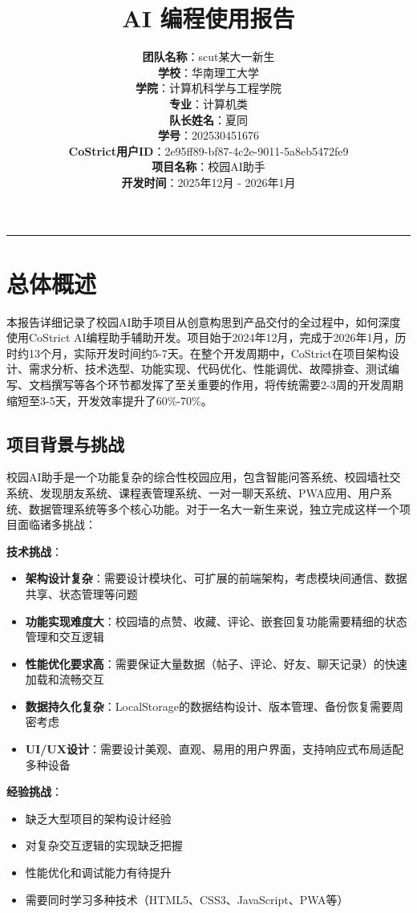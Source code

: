 ﻿\documentclass[12pt,a4paper]{article}
\title{\textbf{AI 编程使用报告}}
\author{
    \textbf{团队名称}：scut某大一新生 \\
    \vspace{0.3cm}
    \textbf{学校}：华南理工大学 \\
    \vspace{0.3cm}
    \textbf{学院}：计算机科学与工程学院 \\
    \vspace{0.3cm}
    \textbf{专业}：计算机类 \\
    \vspace{0.3cm}
    \textbf{队长姓名}：夏同 \\
    \vspace{0.3cm}
    \textbf{学号}：202530451676 \\
    \vspace{0.3cm}
    \textbf{CoStrict用户ID}：2e95ff89-bf87-4c2e-9011-5a8eb5472fe9 \\
    \vspace{0.3cm}
    \textbf{项目名称}：校园AI助手 \\
    \vspace{0.3cm}
    \textbf{开发时间}：2025年12月 - 2026年1月
}
\date{}
\begin{document}
\maketitle

\hrule
\vspace{1cm}

\section{总体概述}

本报告详细记录了校园AI助手项目从创意构思到产品交付的全过程中，如何深度使用CoStrict AI编程助手辅助开发。项目始于2024年12月，完成于2026年1月，历时约13个月，实际开发时间约5-7天。在整个开发周期中，CoStrict在项目架构设计、需求分析、技术选型、功能实现、代码优化、性能调优、故障排查、测试编写、文档撰写等各个环节都发挥了至关重要的作用，将传统需要2-3周的开发周期缩短至3-5天，开发效率提升了60\%-70\%。

\subsection{项目背景与挑战}

校园AI助手是一个功能复杂的综合性校园应用，包含智能问答系统、校园墙社交系统、发现朋友系统、课程表管理系统、一对一聊天系统、PWA应用、用户系统、数据管理系统等多个核心功能。对于一名大一新生来说，独立完成这样一个项目面临诸多挑战：

\textbf{技术挑战}：
\begin{itemize}
    \item \textbf{架构设计复杂}：需要设计模块化、可扩展的前端架构，考虑模块间通信、数据共享、状态管理等问题
    \item \textbf{功能实现难度大}：校园墙的点赞、收藏、评论、嵌套回复功能需要精细的状态管理和交互逻辑
    \item \textbf{性能优化要求高}：需要保证大量数据（帖子、评论、好友、聊天记录）的快速加载和流畅交互
    \item \textbf{数据持久化复杂}：LocalStorage的数据结构设计、版本管理、备份恢复需要周密考虑
    \item \textbf{UI/UX设计}：需要设计美观、直观、易用的用户界面，支持响应式布局适配多种设备
\end{itemize}

\textbf{经验挑战}：
\begin{itemize}
    \item 缺乏大型项目的架构设计经验
    \item 对复杂交互逻辑的实现缺乏把握
    \item 性能优化和调试能力有待提升
    \item 需要同时学习多种技术（HTML5、CSS3、JavaScript、PWA等）
\end{itemize}
\end{document}
